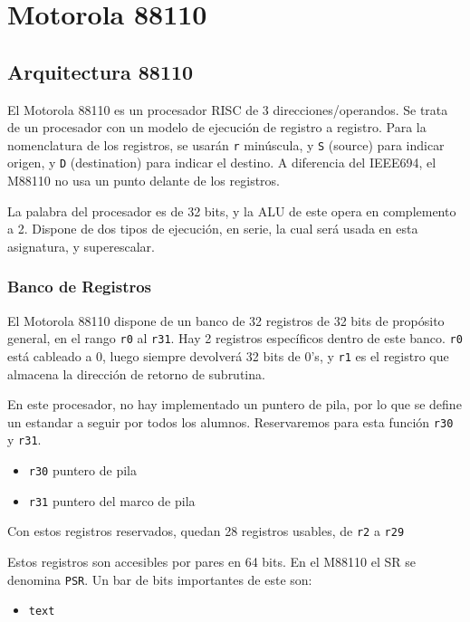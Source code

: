 \documentclass[a4paper,11pt,spanish]{report}
\begin{document}
\chapter{Motorola 88110}
\section{Arquitectura 88110}
El Motorola 88110 es un procesador RISC de 3 direcciones/operandos. Se trata de un procesador con un modelo de ejecución de registro a registro. Para la nomenclatura de los registros, se usarán \verb|r| minúscula, y \verb|S| (source) para indicar origen, y \verb|D| (destination) para indicar el destino. A diferencia del IEEE694, el M88110 no usa un punto delante de los registros.

La palabra del procesador es de 32 bits, y la ALU de este opera en complemento a 2. Dispone de dos tipos de ejecución, en serie, la cual será usada en esta asignatura, y superescalar.
\subsection{Banco de Registros}
El Motorola 88110 dispone de un banco de 32 registros de 32 bits de propósito general, en el rango \verb|r0| al \verb|r31|. Hay 2 registros específicos dentro de este banco.
\verb|r0| está cableado a 0, luego siempre devolverá 32 bits de 0's, y \verb|r1| es el registro que almacena la dirección de retorno de subrutina.

En este procesador, no hay implementado un puntero de pila, por lo que se define un estandar a seguir por todos los alumnos. Reservaremos para esta función \verb|r30| y \verb|r31|.
\begin{itemize}
\item \verb|r30| \textrightarrow puntero de pila
\item \verb|r31| \textrightarrow puntero del marco de pila
\end{itemize}
Con estos registros reservados, quedan 28 registros usables, de \verb|r2| a \verb|r29|

Estos registros son accesibles por pares en 64 bits. En el M88110 el SR se denomina \verb|PSR|. Un bar de bits importantes de este son:
\begin{itemize}
\item \verb|text|
\end{itemize}
\end{document}
